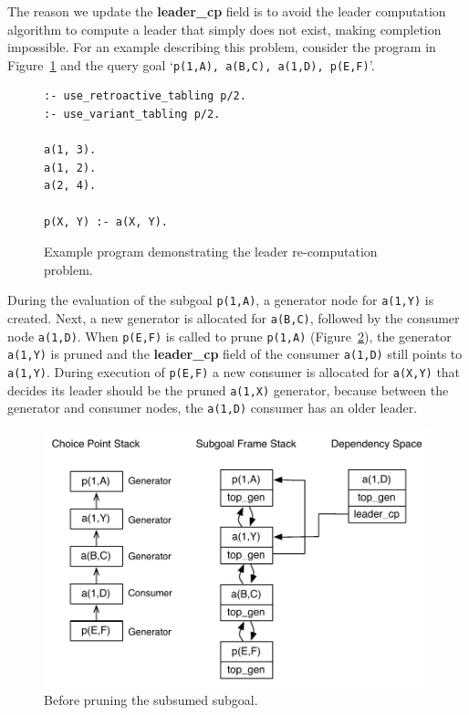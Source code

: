 The reason we update the \textbf{leader\_cp} field is to avoid the leader computation algorithm to compute
a leader that simply does not exist, making completion impossible.
For an example describing this problem, consider the program in Figure~\ref{fig:retro_leader_program}
and the query goal `\texttt{p(1,A),~a(B,C),~a(1,D),~p(E,F)}'.

\begin{figure}[ht]
\begin{Verbatim}
:- use_retroactive_tabling p/2.
:- use_variant_tabling p/2.

a(1, 3).
a(1, 2).
a(2, 4).

p(X, Y) :- a(X, Y).
\end{Verbatim}
\caption{Example program demonstrating the leader re-computation problem.}
\label{fig:retro_leader_program}
\end{figure}

During the evaluation of the subgoal \texttt{p(1,A)}, a generator node
for \texttt{a(1,Y)} is created. Next, a new generator is allocated for \texttt{a(B,C)},
followed by the consumer node \texttt{a(1,D)}. When \texttt{p(E,F)} is called to
prune \texttt{p(1,A)} (Figure~\ref{fig:retro_leader_recomputation}), the generator \texttt{a(1,Y)}
is pruned and the \textbf{leader\_cp}
field of the consumer \texttt{a(1,D)} still points to \texttt{a(1,Y)}.
During execution of \texttt{p(E,F)} a new consumer is allocated for \texttt{a(X,Y)} that
decides its leader should be the pruned \texttt{a(1,X)} generator, because between
the generator and consumer nodes, the \texttt{a(1,D)} consumer has an older leader.

\begin{figure}[ht]
  \centering
    \includegraphics[scale=0.6]{retro_leader_recomputation.pdf}
  \caption{Before pruning the subsumed subgoal.}
  \label{fig:retro_leader_recomputation}
\end{figure}

